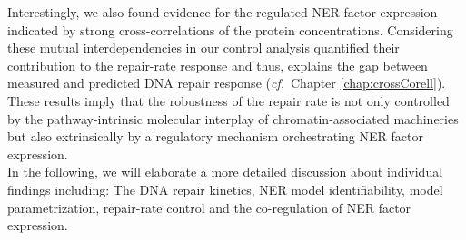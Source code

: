 Interestingly, we also found evidence for the regulated NER factor expression indicated by strong cross-correlations of the protein concentrations. Considering these mutual interdependencies in our control analysis quantified their contribution to the repair-rate response and thus, explains the gap between measured and predicted DNA repair response (\textit{cf.}\ Chapter \ref{chap:crossCorell}). These results imply that the robustness of the repair rate is not only controlled by the pathway-intrinsic molecular interplay of chromatin-associated machineries but also extrinsically by a regulatory mechanism orchestrating NER factor expression.\\
In the following, we will elaborate a more detailed discussion about individual findings including: The DNA repair kinetics, NER model identifiability, model parametrization, repair-rate control and the co-regulation of NER factor expression.     
%
%


